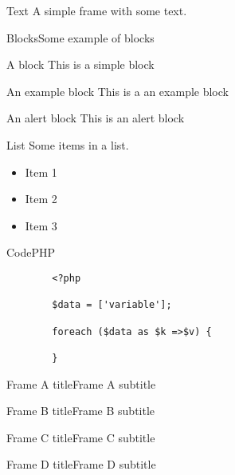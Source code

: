 





\begin{frame}[plain]
	\titlepage{}
\end{frame}

\begin{frame}{Text}
    A simple frame with some text.
\end{frame}

\begin{frame}{Blocks}{Some example of blocks}
    \begin{block}{A block}
        This is a simple block
    \end{block}

    \begin{exampleblock}{An example block}
        This is a an example block
    \end{exampleblock}

    \begin{alertblock}{An alert block}
        This is an alert block
    \end{alertblock}

\end{frame}

\begin{frame}{List}
    Some items in a list.

    \begin{itemize}[<+->]
        \item Item 1
        \item Item 2
        \item Item 3
    \end{itemize}

\end{frame}

\begin{frame}[fragile]{Code}{PHP}
    \begin{lstlisting}
        <?php

        $data = ['variable'];

        foreach ($data as $k =>$v) {

        }
    \end{lstlisting}
\end{frame}

\begin{frameA}{Frame A title}{Frame A subtitle}
\end{frameA}

\begin{frameB}{Frame B title}{Frame B subtitle}
\end{frameB}

\begin{frameC}{Frame C title}{Frame C subtitle}
\end{frameC}

\begin{frameD}{Frame D title}{Frame D subtitle}
\end{frameD}


